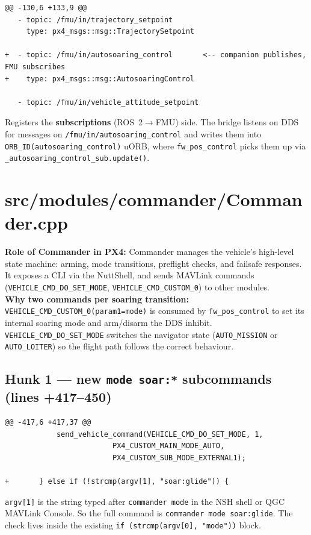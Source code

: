 \documentclass[12pt,a4paper]{article}
\begin{document}
\begin{lstlisting}[style=diff]
@@ -130,6 +133,9 @@
   - topic: /fmu/in/trajectory_setpoint
     type: px4_msgs::msg::TrajectorySetpoint

+  - topic: /fmu/in/autosoaring_control       <-- companion publishes, FMU subscribes
+    type: px4_msgs::msg::AutosoaringControl

   - topic: /fmu/in/vehicle_attitude_setpoint
\end{lstlisting}
\begin{annotation}Registers the \textbf{subscriptions} (ROS~2$\to$FMU) side. The bridge listens on DDS for messages on \texttt{/fmu/in/autosoaring\_control} and writes them into \texttt{ORB\_ID(autosoaring\_control)} uORB, where \texttt{fw\_pos\_control} picks them up via \texttt{\_autosoaring\_control\_sub.update()}.\end{annotation}

\section{src/modules/commander/Commander.cpp}

\begin{annotation}
\textbf{Role of Commander in PX4:} Commander manages the vehicle's high-level state machine: arming, mode transitions, preflight checks, and failsafe responses. It exposes a CLI via the NuttShell, and sends MAVLink commands (\texttt{VEHICLE\_CMD\_DO\_SET\_MODE}, \texttt{VEHICLE\_CMD\_CUSTOM\_0}) to other modules.\\

\textbf{Why two commands per soaring transition:} \texttt{VEHICLE\_CMD\_CUSTOM\_0(param1=mode)} is consumed by \texttt{fw\_pos\_control} to set its internal soaring mode and arm/disarm the DDS inhibit. \texttt{VEHICLE\_CMD\_DO\_SET\_MODE} switches the navigator state (\texttt{AUTO\_MISSION} or \texttt{AUTO\_LOITER}) so the flight path follows the correct behaviour.
\end{annotation}

\subsection{Hunk 1 — new \texttt{mode soar:*} subcommands (lines +417--450)}

\begin{lstlisting}[style=diff]
@@ -417,6 +417,37 @@
			send_vehicle_command(VEHICLE_CMD_DO_SET_MODE, 1,
					     PX4_CUSTOM_MAIN_MODE_AUTO,
					     PX4_CUSTOM_SUB_MODE_EXTERNAL1);

+		} else if (!strcmp(argv[1], "soar:glide")) {
\end{lstlisting}
\begin{annotation}\texttt{argv[1]} is the string typed after \texttt{commander mode} in the NSH shell or QGC MAVLink Console. So the full command is \texttt{commander mode soar:glide}. The check lives inside the existing \texttt{if (strcmp(argv[0], "mode"))} block.\end{annotation}
\end{document}
